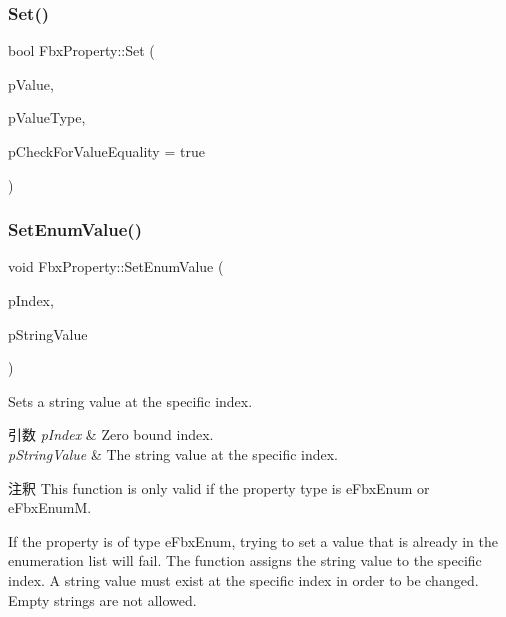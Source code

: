 \subsubsection{\texorpdfstring{Set()}{Set()}\hspace{0.1cm}{\footnotesize\ttfamily [2/2]}}
{\footnotesize\ttfamily bool Fbx\+Property\+::\+Set (\begin{DoxyParamCaption}\item[{const void $\ast$}]{p\+Value,  }\item[{const \hyperlink{fbxpropertytypes_8h_a73913a5ddfb20e57c6f25e9e6784bd92}{E\+Fbx\+Type} \&}]{p\+Value\+Type,  }\item[{bool}]{p\+Check\+For\+Value\+Equality = {\ttfamily true} }\end{DoxyParamCaption})\hspace{0.3cm}{\ttfamily [protected]}}

\mbox{\label{class_fbx_property_ae9dd7a699742397756227ac1dbd9eb13}} 
\subsubsection{\texorpdfstring{Set\+Enum\+Value()}{SetEnumValue()}}
{\footnotesize\ttfamily void Fbx\+Property\+::\+Set\+Enum\+Value (\begin{DoxyParamCaption}\item[{int}]{p\+Index,  }\item[{const char $\ast$}]{p\+String\+Value }\end{DoxyParamCaption})}

Sets a string value at the specific index. 
\begin{DoxyParams}{引数}
{\em p\+Index} & Zero bound index. \\
\hline
{\em p\+String\+Value} & The string value at the specific index. \\
\hline
\end{DoxyParams}
\begin{DoxyRemark}{注釈}
This function is only valid if the property type is e\+Fbx\+Enum or e\+Fbx\+EnumM. 

If the property is of type e\+Fbx\+Enum, trying to set a value that is already in the enumeration list will fail. The function assigns the string value to the specific index. A string value must exist at the specific index in order to be changed. Empty strings are not allowed. 
\end{DoxyRemark}
\mbox{\label{class_fbx_property_a65a521dab6bcd5c3f2570f555dbcaddc}} 
